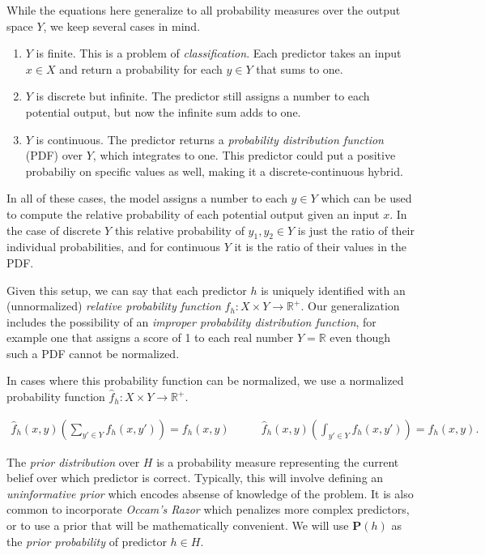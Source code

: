 \documentclass[twoside]{article}
\begin{document}
While the equations here generalize to all probability measures over the output space \(Y\), we keep several cases in mind.
\begin{enumerate}
	\item \(Y\) is finite. This is a problem of \textit{classification}. Each predictor takes an input \(x \in X\) and return a probability for each \(y \in Y\) that sums to one.
	\item \(Y\) is discrete but infinite. The predictor still assigns a number to each potential output, but now the infinite sum adds to one.
	\item \(Y\) is continuous. The predictor returns a \textit{probability distribution function} (PDF) over \(Y\), which integrates to one. This predictor could put a positive probabiliy on specific values as well, making it a discrete-continuous hybrid. 
\end{enumerate}

In all of these cases, the model assigns a number to each \(y \in Y\) which can be used to compute the relative probability of each potential output given an input \(x\). In the case of discrete \(Y\) this relative probability of \(y_1, y_2 \in Y\) is just the ratio of their individual probabilities, and for continuous \(Y\) it is the ratio of their values in the PDF. 

Given this setup, we can say that each predictor \(h\) is uniquely identified with an (unnormalized) \textit{relative probability function} \(f_h: X \times Y \rightarrow \mathbb{R}^+\). Our generalization includes the possibility of an \textit{improper probability distribution function}, for example one that assigns a score of 1 to each real number \(Y=\mathbb{R}\) even though such a PDF cannot be normalized.

In cases where this probability function can be normalized, we use a normalized probability function \(\hat{f}_h: X \times Y \rightarrow \mathbb{R}^+\).

\begin{align}
\label{eq:normalized_probability_model}
\hat{f}_h(x, y)\left(\sum_{y' \in Y} f_h(x,y')\right)=f_h(x, y) &
\qquad\hat{f}_h(x, y)\left(\int_{y' \in Y} f_h(x,y')\right)=f_h(x, y).
\end{align}

The \textit{prior distribution} over \(H\) is a probability measure representing the current belief over which predictor is correct. Typically, this will involve defining an \textit{uninformative prior} which encodes absense of knowledge of the problem. It is also common to incorporate \textit{Occam's Razor} which penalizes more complex predictors, or to use a prior that will be mathematically convenient. We will use \(\mathbf{P}(h)\) as the \textit{prior probability} of predictor \(h \in H\).
\end{document}

